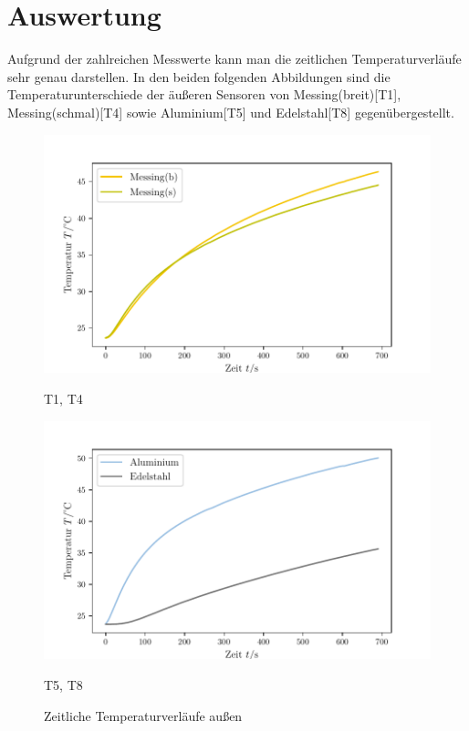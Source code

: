 \section{Auswertung}
\label{sec:Auswertung}
Aufgrund der zahlreichen Messwerte kann man die zeitlichen Temperaturverläufe sehr genau darstellen.
In den beiden folgenden Abbildungen sind die Temperaturunterschiede der äußeren Sensoren von Messing(breit)[T1], Messing(schmal)[T4] sowie Aluminium[T5] und Edelstahl[T8] gegenübergestellt.
\begin{figure}
    \centering
    \begin{minipage}{.5\textwidth}
        \centering
        \includegraphics[max width=1.1\linewidth]{build/plot_t1_t4.pdf}
        \caption{T1, T4}
        \label{fig:plot_t1_t4}
    \end{minipage}%
    \begin{minipage}{.5\textwidth}
        \centering
        \includegraphics[max width=1.1\linewidth]{build/plot_t5_t8.pdf}
        \caption{T5, T8}
        \label{fig:plot_t5_t8}
    \end{minipage}
    \caption{Zeitliche Temperaturverläufe außen}
    \label{fig:tempDiff_t1t4t5t8}
\end{figure}


